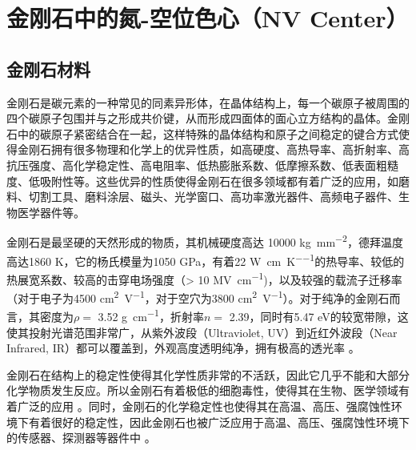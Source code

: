 \documentclass[type = bachelor, oneside]{whu-thesis}
\begin{document}

\chapter{金刚石中的氮-空位色心（NV Center）}

\section{金刚石材料}
金刚石是碳元素的一种常见的同素异形体，在晶体结构上，每一个碳原子被周围的四个碳原子包围并与之形成共价键，从而形成四面体的面心立方结构的晶体。金刚石中的碳原子紧密结合在一起，这样特殊的晶体结构和原子之间稳定的键合方式使得金刚石拥有很多物理和化学上的优异性质，如高硬度、高热导率、高折射率、高抗压强度、高化学稳定性、高电阻率、低热膨胀系数、低摩擦系数、低表面粗糙度、低吸附性等。这些优异的性质使得金刚石在很多领域都有着广泛的应用，如磨料、切割工具、磨料涂层、磁头、光学窗口、高功率激光器件、高频电子器件、生物医学器件等。

金刚石是最坚硬的天然形成的物质，其机械硬度高达 10000 \unit{\kilogram\per\milli\meter\squared}，德拜温度高达1860 \unit{\kelvin}，它的杨氏模量为1050 \unit{\GPa}，有着22 \unit{\watt\per\centi\meter\per\kelvin}的热导率、较低的热展宽系数、较高的击穿电场强度（> 10 \unit{\mega\volt\per\centi\meter})，以及较强的载流子迁移率（对于电子为4500 \unit{\centi\meter\squared\per\volt}，对于空穴为3800 \unit{\centi\meter\squared\per\volt}）。对于纯净的金刚石而言，其密度为$\rho =$ 3.52 \unit{\g\per\cm}，折射率$n =$ 2.39，同时有5.47 \unit{\electronvolt}的较宽带隙，这使其投射光谱范围非常广，从紫外波段（Ultraviolet, UV）到近红外波段（Near Infrared, IR）都可以覆盖到，外观高度透明纯净，拥有极高的透光率 \cite{2013, Loncar2013}。

金刚石在结构上的稳定性使得其化学性质非常的不活跃，因此它几乎不能和大部分化学物质发生反应。所以金刚石有着极低的细胞毒性，使得其在生物、医学领域有着广泛的应用 \cite{Schirhagl2014,Wu2016}。同时，金刚石的化学稳定性也使得其在高温、高压、强腐蚀性环境下有着很好的稳定性，因此金刚石也被广泛应用于高温、高压、强腐蚀性环境下的传感器、探测器等器件中 \cite{Umezawa2012, Jayaraman1983}。
\end{document}
